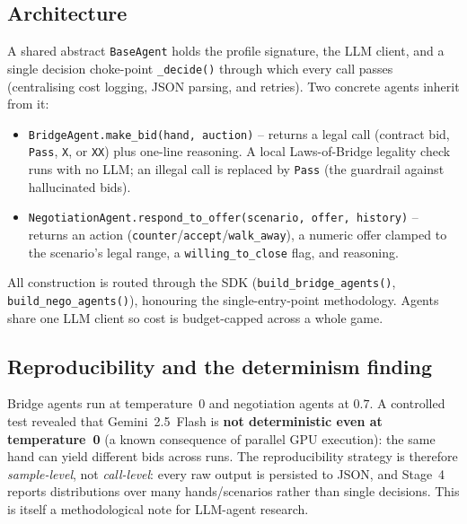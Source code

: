 \documentclass[11pt, a4paper, oneside, openany]{report}
\begin{document}
\subsection*{Architecture}
A shared abstract \texttt{BaseAgent} holds the profile signature, the LLM client, and a single decision choke-point \texttt{\_decide()} through which every call passes (centralising cost logging, JSON parsing, and retries). Two concrete agents inherit from it:
\begin{itemize}[leftmargin=*]
    \item \texttt{BridgeAgent.make\_bid(hand, auction)} -- returns a legal call (contract bid, \texttt{Pass}, \texttt{X}, or \texttt{XX}) plus one-line reasoning. A local Laws-of-Bridge legality check runs with no LLM; an illegal call is replaced by \texttt{Pass} (the guardrail against hallucinated bids).
    \item \texttt{NegotiationAgent.respond\_to\_offer(scenario, offer, history)} -- returns an action (\texttt{counter}/\texttt{accept}/\texttt{walk\_away}), a numeric offer clamped to the scenario's legal range, a \texttt{willing\_to\_close} flag, and reasoning.
\end{itemize}
All construction is routed through the SDK (\texttt{build\_bridge\_agents()}, \texttt{build\_nego\_agents()}), honouring the single-entry-point methodology. Agents share one LLM client so cost is budget-capped across a whole game.

\subsection*{Reproducibility and the determinism finding}
Bridge agents run at temperature~$0$ and negotiation agents at $0.7$. A controlled test revealed that Gemini~2.5~Flash is \textbf{not deterministic even at temperature~0} (a known consequence of parallel GPU execution): the same hand can yield different bids across runs. The reproducibility strategy is therefore \emph{sample-level}, not \emph{call-level}: every raw output is persisted to JSON, and Stage~4 reports distributions over many hands/scenarios rather than single decisions. This is itself a methodological note for LLM-agent research.
\end{document}
